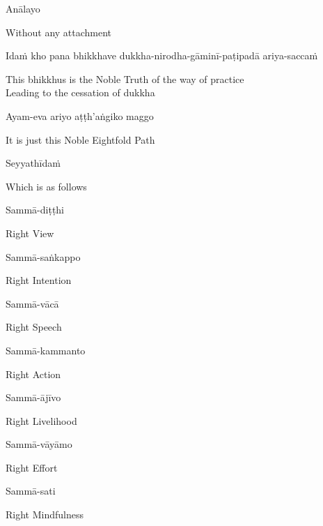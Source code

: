 Anālayo

\begin{cprenglish}
Without any attachment
\end{cprenglish}

Idaṁ kho pana bhikkhave dukkha-nirodha-gāminī-paṭipadā ariya-saccaṁ

\begin{cprenglish}
This bhikkhus is the Noble Truth of the way of practice\\
Leading to the cessation of dukkha
\end{cprenglish}

Ayam-eva ariyo aṭṭh’aṅgiko maggo

\begin{cprenglish}
It is just this Noble Eightfold Path
\end{cprenglish}

Seyyathīdaṁ

\begin{cprenglish}
Which is as follows
\end{cprenglish}

Sammā-diṭṭhi

\begin{cprenglish}
Right View
\end{cprenglish}

Sammā-saṅkappo

\begin{cprenglish}
Right Intention
\end{cprenglish}

Sammā-vācā

\begin{cprenglish}
Right Speech
\end{cprenglish}

Sammā-kammanto

\begin{cprenglish}
Right Action
\end{cprenglish}

Sammā-ājīvo

\begin{cprenglish}
Right Livelihood
\end{cprenglish}

Sammā-vāyāmo

\begin{cprenglish}
Right Effort
\end{cprenglish}

Sammā-sati

\begin{cprenglish}
Right Mindfulness
\end{cprenglish}

